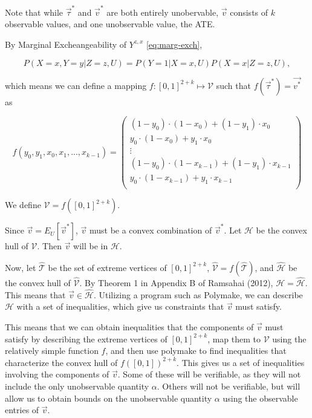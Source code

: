 \documentclass[
]{article}
\theoremstyle{plain}
\begin{document}
Note that while \(\vec{\tau}^*\) and \(\vec{v}^*\) are both entirely unobervable, \(\vec{v}\) consists of \(k\) observable values, and one unobservable value, the ATE.

By Marginal Excheangeability of \(Y^{z,x}\) \eqref{eq:marg-exch},

\[
P(X = x, Y = y | Z = z, U) = P(Y = 1 | X = x, U) P(X = x | Z = z, U),
\]

which means we can define a mapping \(f:[0,1]^{2+k} \mapsto \mathcal{V}\) such that \(f(\vec{\tau}^*) = \vec{v^*}\) as

\[
f(y_0, y_1, x_0, x_1, ..., x_{k-1}) = 
  \begin{pmatrix} 
    (1-y_0)\cdot(1-x_0) + (1 - y_1)\cdot x_0 \\
    y_0\cdot (1-x_0) + y_1\cdot x_0 \\
    \vdots \\
    (1-y_0)\cdot(1-x_{k-1}) + (1 - y_1)\cdot x_{k-1} \\
    y_0\cdot (1-x_{k-1}) + y_1\cdot x_{k-1} \\
  \end{pmatrix} \label{eq:f}
\]

We define \(\mathcal{V} = f([0,1]^{2+k})\).

Since \(\vec{v} = E_U[\vec{v}^*]\), \(\vec{v}\) must be a convex combination of \(\vec{v}^*\). Let \(\mathcal{H}\) be the convex hull of \(\mathcal{V}\). Then \(\vec{v}\) will be in \(\mathcal{H}\).

Now, let \(\hat{\mathcal{T}}\) be the set of extreme vertices of \([0,1]^{2+k}\), \(\hat{\mathcal{V}} = f(\hat{\mathcal{T}})\), and \(\hat{\mathcal{H}}\) be the convex hull of \(\hat{\mathcal{V}}\). By Theorem 1 in Appendix B of Ramsahai (2012), \(\mathcal{H} = \mathcal{\hat{H}}\). This means that \(\vec{v} \in \mathcal{\hat{H}}\). Utilizing a program such as Polymake, we can describe \(\mathcal{H}\) with a set of inequalities, which give us constraints that \(\vec{v}\) must satisfy.

This means that we can obtain inequalities that the components of \(\vec{v}\) must satisfy by describing the extreme vertices of \([0,1]^{2+k}\), map them to \(\mathcal{V}\) using the relatively simple function \(f\), and then use polymake to find inequalities that characterize the convex hull of \(f([0,1])^{2+k}\). This gives us a set of inequalities involving the components of \(\vec{v}\). Some of these will be verifiable, as they will not include the only unobservable quantity \(\alpha\). Others will not be verifiable, but will allow us to obtain bounds on the unobservable quantity \(\alpha\) using the observable entries of \(\vec{v}\).
\end{document}

